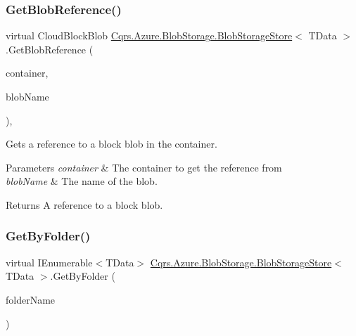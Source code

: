 \subsubsection{\texorpdfstring{Get\+Blob\+Reference()}{GetBlobReference()}}
{\footnotesize\ttfamily virtual Cloud\+Block\+Blob \hyperlink{classCqrs_1_1Azure_1_1BlobStorage_1_1BlobStorageStore}{Cqrs.\+Azure.\+Blob\+Storage.\+Blob\+Storage\+Store}$<$ T\+Data $>$.Get\+Blob\+Reference (\begin{DoxyParamCaption}\item[{Cloud\+Blob\+Container}]{container,  }\item[{string}]{blob\+Name }\end{DoxyParamCaption})\hspace{0.3cm}{\ttfamily [protected]}, {\ttfamily [virtual]}}



Gets a reference to a block blob in the container. 


\begin{DoxyParams}{Parameters}
{\em container} & The container to get the reference from\\
\hline
{\em blob\+Name} & The name of the blob.\\
\hline
\end{DoxyParams}
\begin{DoxyReturn}{Returns}
A reference to a block blob.
\end{DoxyReturn}
\mbox{\label{classCqrs_1_1Azure_1_1BlobStorage_1_1BlobStorageStore_a96064e01ccf12413582acd7497f3802d_a96064e01ccf12413582acd7497f3802d}} 
\subsubsection{\texorpdfstring{Get\+By\+Folder()}{GetByFolder()}}
{\footnotesize\ttfamily virtual I\+Enumerable$<$T\+Data$>$ \hyperlink{classCqrs_1_1Azure_1_1BlobStorage_1_1BlobStorageStore}{Cqrs.\+Azure.\+Blob\+Storage.\+Blob\+Storage\+Store}$<$ T\+Data $>$.Get\+By\+Folder (\begin{DoxyParamCaption}\item[{string}]{folder\+Name }\end{DoxyParamCaption})\hspace{0.3cm}{\ttfamily [virtual]}}

